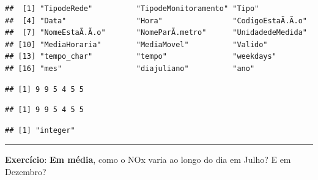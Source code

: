 \documentclass[]{book}
\newenvironment{Shaded}{\begin{snugshade}}{\end{snugshade}}
\newcommand{\KeywordTok}[1]{\textcolor[rgb]{0.13,0.29,0.53}{\textbf{#1}}}
\newcommand{\DecValTok}[1]{\textcolor[rgb]{0.00,0.00,0.81}{#1}}
\newcommand{\StringTok}[1]{\textcolor[rgb]{0.31,0.60,0.02}{#1}}
\newcommand{\OperatorTok}[1]{\textcolor[rgb]{0.81,0.36,0.00}{\textbf{#1}}}
\newcommand{\NormalTok}[1]{#1}
\theoremstyle{definition}
\theoremstyle{definition}
\theoremstyle{definition}
\theoremstyle{remark}
\begin{document}
\begin{verbatim}
##  [1] "TipodeRede"          "TipodeMonitoramento" "Tipo"               
##  [4] "Data"                "Hora"                "CodigoEstaÃ.Ã.o"    
##  [7] "NomeEstaÃ.Ã.o"       "NomeParÃ.metro"      "UnidadedeMedida"    
## [10] "MediaHoraria"        "MediaMovel"          "Valido"             
## [13] "tempo_char"          "tempo"               "weekdays"           
## [16] "mes"                 "diajuliano"          "ano"
\end{verbatim}

\begin{Shaded}
\end{Shaded}

\begin{verbatim}
## [1] 9 9 5 4 5 5
\end{verbatim}

\begin{Shaded}
\end{Shaded}

\begin{verbatim}
## [1] 9 9 5 4 5 5
\end{verbatim}

\begin{Shaded}
\end{Shaded}

\begin{verbatim}
## [1] "integer"
\end{verbatim}

\begin{center}\rule{0.5\linewidth}{\linethickness}\end{center}

{\textbf{Exercício}: \textbf{Em média}, como o NOx varia ao longo do dia
em Julho? E em Dezembro?}
\end{document}
